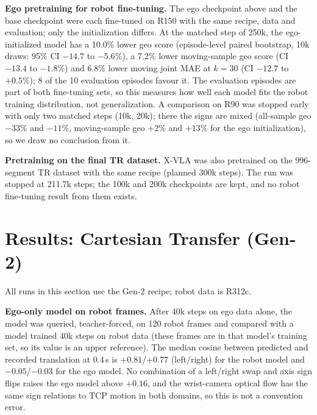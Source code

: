 \documentclass[conference,10pt]{IEEEtran}
\begin{document}
\textbf{Ego pretraining for robot fine-tuning.} The ego checkpoint above and the base checkpoint were each fine-tuned on R150 with
the same recipe, data and evaluation; only the initialization differs. At the matched step of 250k, the ego-initialized model has a
10.0\% lower geo score (episode-level paired bootstrap, 10k draws: 95\% CI $-14.7$ to $-5.6\%$), a 7.2\% lower moving-sample geo score
(CI $-13.4$ to $-1.8\%$) and 6.8\% lower moving joint MAE at $k{=}30$ (CI $-12.7$ to $+0.5\%$); 8 of the 10 evaluation episodes favour
it. The evaluation episodes are part of both fine-tuning sets, so this measures how well each model fits the robot training
distribution, not generalization. A comparison on R90 was stopped early with only two matched steps (10k, 20k); there the signs are
mixed (all-sample geo $-33\%$ and $-11\%$, moving-sample geo $+2\%$ and $+13\%$ for the ego initialization), so we draw no conclusion
from it.

\textbf{Pretraining on the final TR dataset.} X-VLA was also pretrained on the 996-segment TR dataset with the same recipe (planned
300k steps). The run was stopped at 211.7k steps; the 100k and 200k checkpoints are kept, and no robot fine-tuning result from them
exists.

\section{Results: Cartesian Transfer (Gen-2)}\label{sec:res2}
All runs in this section use the Gen-2 recipe; robot data is R312c.

\textbf{Ego-only model on robot frames.} After 40k steps on ego data alone, the model was queried, teacher-forced, on 120 robot frames
and compared with a model trained 40k steps on robot data (these frames are in that model's training set, so its value is an upper
reference). The median cosine between predicted and recorded translation at 0.4\,s is $+0.81$/$+0.77$ (left/right) for the robot
model and $-0.05$/$-0.03$ for the ego model. No combination of a left/right swap and axis sign flips raises the ego model above
$+0.16$, and the wrist-camera optical flow has the same sign relations to TCP motion in both domains, so this is not a convention
error.
\end{document}

